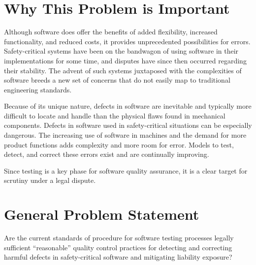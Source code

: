 \section{Why This Problem is Important}
Although software does offer the benefits of added flexibility, increased
functionality, and reduced costs, it provides unprecedented possibilities for
errors. Safety-critical systems have been on the bandwagon of using software in
their implementations for some time, and disputes have since then occurred
regarding their stability. The advent of such systems juxtaposed with the
complexities of software breeds a new set of concerns that do not easily map to
traditional engineering standards.

Because of its unique nature, defects in software are inevitable and typically
more difficult to locate and handle than the physical flaws found in mechanical
components. Defects in software used in safety-critical situations can be
especially dangerous. The increasing use of software in machines and the demand
for more product functions adds complexity and more room for error. Models to
test, detect, and correct these errors exist and are continually improving.

Since testing is a key phase for software quality assurance, it is a clear
target for scrutiny under a legal dispute.

\section{General Problem Statement}
Are the current standards of procedure for software testing processes legally
sufficient ``reasonable'' quality control practices for detecting and correcting
harmful defects in safety-critical software and mitigating liability exposure?
